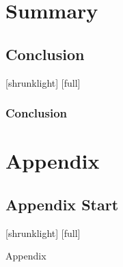 \documentclass[14pt,compress,aspectratio=169]{beamer} %
\begin{document}
\section{Summary} 

\subsection{Conclusion}
[shrunklight]
[full]
\begin{frame}
\frametitle{Conclusion}
	\begin{table}
	\LARGE
	\begin{center}
	\end{center}
	\end{table}
\end{frame}




\appendix
\backupbegin
\section{Appendix}

\subsection{Appendix Start}
[shrunklight]
[full]
\begin{frame}
	\centering
	\huge Appendix
\end{frame}

 

\backupend
\end{document}
